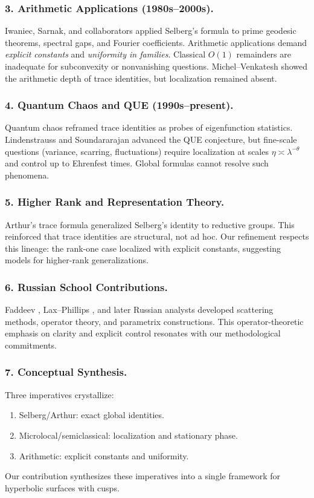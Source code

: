 \subsubsection*{3. Arithmetic Applications (1980s–2000s).}
Iwaniec, Sarnak, and collaborators \cite{Iwaniec2002,LuoSarnak1995}
applied Selberg’s formula to prime geodesic theorems, spectral gaps, and Fourier coefficients.
Arithmetic applications demand \emph{explicit constants} and \emph{uniformity in families}.
Classical $O(1)$ remainders are inadequate for subconvexity or nonvanishing questions.
Michel–Venkatesh \cite{MichelVenkatesh2010} showed the arithmetic depth of trace identities,
but localization remained absent.

\subsubsection*{4. Quantum Chaos and QUE (1990s–present).}
Quantum chaos reframed trace identities as probes of eigenfunction statistics.
Lindenstrauss \cite{LindenstraussQUE} and Soundararajan \cite{SoundararajanQUE}
advanced the QUE conjecture, but fine-scale questions (variance, scarring, fluctuations)
require localization at scales $\eta\asymp\lambda^{-\theta}$ and control up to Ehrenfest times.
Global formulas cannot resolve such phenomena.

\subsubsection*{5. Higher Rank and Representation Theory.}
Arthur’s trace formula \cite{ArthurBook} generalized Selberg’s identity to reductive groups.
This reinforced that trace identities are structural, not ad hoc.
Our refinement respects this lineage: the rank-one case localized with explicit constants,
suggesting models for higher-rank generalizations.

\subsubsection*{6. Russian School Contributions.}
Faddeev \cite{Faddeev1967}, Lax–Phillips \cite{LaxPhillips1976}, and later Russian analysts
developed scattering methods, operator theory, and parametrix constructions.
This operator-theoretic emphasis on clarity and explicit control
resonates with our methodological commitments.

\subsubsection*{7. Conceptual Synthesis.}
Three imperatives crystallize:
\begin{enumerate}[label=\arabic*.]
  \item Selberg/Arthur: exact global identities.
  \item Microlocal/semiclassical: localization and stationary phase.
  \item Arithmetic: explicit constants and uniformity.
\end{enumerate}
Our contribution synthesizes these imperatives into a single framework
for hyperbolic surfaces with cusps.

